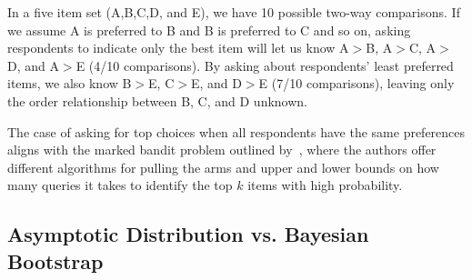 \documentclass[a4paper,11pt]{article}
\begin{document}
In a five item set (A,B,C,D, and E), we have 10 possible two-way comparisons. If we assume A is preferred to B and B is preferred to C and so on, asking respondents to indicate only the best item will let us know A$>$B, A$>$C, A$>$D, and A$>$E (4/10 comparisons). By asking about respondents' least preferred items, we also know B$>$E, C$>$E, and D$>$E (7/10 comparisons), leaving only the order relationship between B, C, and D unknown.

The case of asking for top choices when all respondents have the same preferences aligns with the marked bandit problem outlined by~\cite{simchowitz2016best}, where the authors offer different algorithms for pulling the arms and upper and lower bounds on how many queries it takes to identify the top $k$ items with high probability. 


\subsection{Asymptotic Distribution vs. Bayesian Bootstrap}
\end{document}
